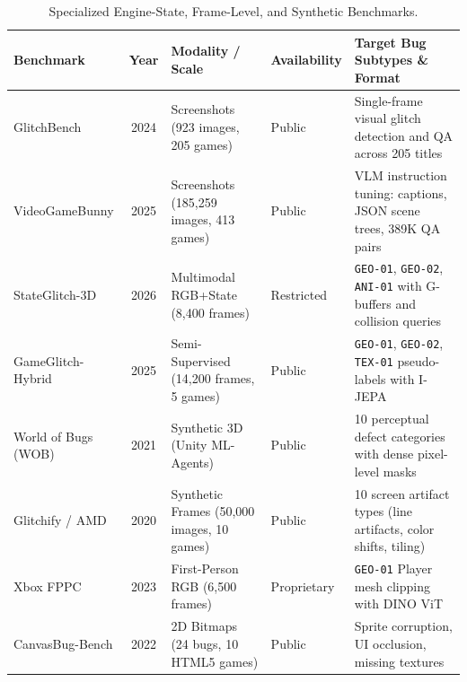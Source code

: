 \documentclass[preprint,12pt,3p]{elsarticle}
\begin{document}
\begin{table}[htbp]
\centering
\small
\caption{Specialized Engine-State, Frame-Level, and Synthetic Benchmarks.}
\label{tab:benchmarks_frame}
\begin{tabularx}{\textwidth}{lcp{3.8cm}lX}
\toprule
\textbf{Benchmark} & \textbf{Year} & \textbf{Modality / Scale} & \textbf{Availability} & \textbf{Target Bug Subtypes \& Format} \\
\midrule
GlitchBench \cite{taesiri2024glitchbench} & 2024 & Screenshots (923 images, 205 games) & Public & Single-frame visual glitch detection and QA across 205 titles \\
VideoGameBunny \cite{taesiri2025videogamebunny} & 2025 & Screenshots (185,259 images, 413 games) & Public & VLM instruction tuning: captions, JSON scene trees, 389K QA pairs \\
StateGlitch-3D \cite{kovacs2026stateaware} & 2026 & Multimodal RGB+State (8,400 frames) & Restricted & \texttt{GEO-01}, \texttt{GEO-02}, \texttt{ANI-01} with G-buffers and collision queries \\
GameGlitch-Hybrid \cite{yi2025hybrid} & 2025 & Semi-Supervised (14,200 frames, 5 games) & Public & \texttt{GEO-01}, \texttt{GEO-02}, \texttt{TEX-01} pseudo-labels with I-JEPA \\
World of Bugs (WOB) \cite{wilkins2022learningperceptual} & 2021 & Synthetic 3D (Unity ML-Agents) & Public & 10 perceptual defect categories with dense pixel-level masks \\
Glitchify / AMD \cite{davarmanesh2020automated} & 2020 & Synthetic Frames (50,000 images, 10 games) & Public & 10 screen artifact types (line artifacts, color shifts, tiling) \\
Xbox FPPC \cite{rahman2023weaksupervision} & 2023 & First-Person RGB (6,500 frames) & Proprietary & \texttt{GEO-01} Player mesh clipping with DINO ViT \\
CanvasBug-Bench \cite{macklon2022html5bugs} & 2022 & 2D Bitmaps (24 bugs, 10 HTML5 games) & Public & Sprite corruption, UI occlusion, missing textures \\
\bottomrule
\end{tabularx}
\end{table}
\end{document}
